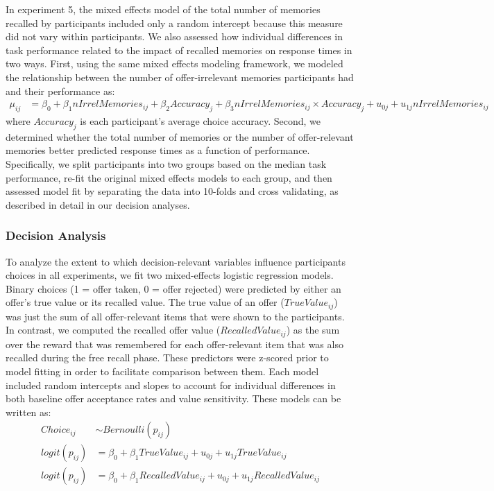 \documentclass[10pt,letterpaper]{article}
\begin{document}
In experiment 5, the mixed effects model of the total number of memories recalled by participants included only a random intercept because this measure did not vary within participants. We also assessed how individual differences in task performance related to the impact of recalled memories on response times in two ways. First, using the same mixed effects modeling framework, we modeled the relationship between the number of offer-irrelevant memories participants had and their performance as:
\begin{align*}
    \mu_{ij} &= \beta_0 + \beta_1nIrrelMemories_{ij} + \beta_2Accuracy_{j} + \beta_3nIrrelMemories_{ij} \times Accuracy_{j}
    \nonumber + u_{0j} + u_{1j}nIrrelMemories_{ij}
\end{align*}
where $Accuracy_j$ is each participant's average choice accuracy. Second, we determined whether the total number of memories or the number of offer-relevant memories better predicted response times as a function of performance. Specifically, we split participants into two groups based on the median task performance, re-fit the original mixed effects models to each group, and then assessed model fit by separating the data into 10-folds and cross validating, as described in detail in our decision analyses.

\subsubsection{Decision Analysis}

To analyze the extent to which decision-relevant variables influence participants choices in all experiments, we fit two  mixed-effects logistic regression models. Binary choices (1 = offer taken, 0 = offer rejected) were predicted by either an offer's true value or its recalled value. The true value of an offer ($TrueValue_{ij}$) was just the sum of all offer-relevant items that were shown to the participants. In contrast, we computed the recalled offer value ($RecalledValue_{ij}$) as the sum over the reward that was remembered for each offer-relevant item that was also recalled during the free recall phase. These predictors were z-scored prior to model fitting in order to facilitate comparison between them. Each model included random intercepts and slopes to account for individual differences in both baseline offer acceptance rates and value sensitivity. These models can be written as:
\begin{align*}
    Choice_{ij} &\sim Bernoulli(p_{ij}) \\
    logit(p_{ij}) &= \beta_0 + \beta_1TrueValue_{ij} \nonumber + u_{0j} + u_{1j}TrueValue_{ij} \\
    logit(p_{ij}) &= \beta_0 + \beta_1RecalledValue_{ij} \nonumber + u_{0j} + u_{1j}RecalledValue_{ij}
\end{align*}
\end{document}
